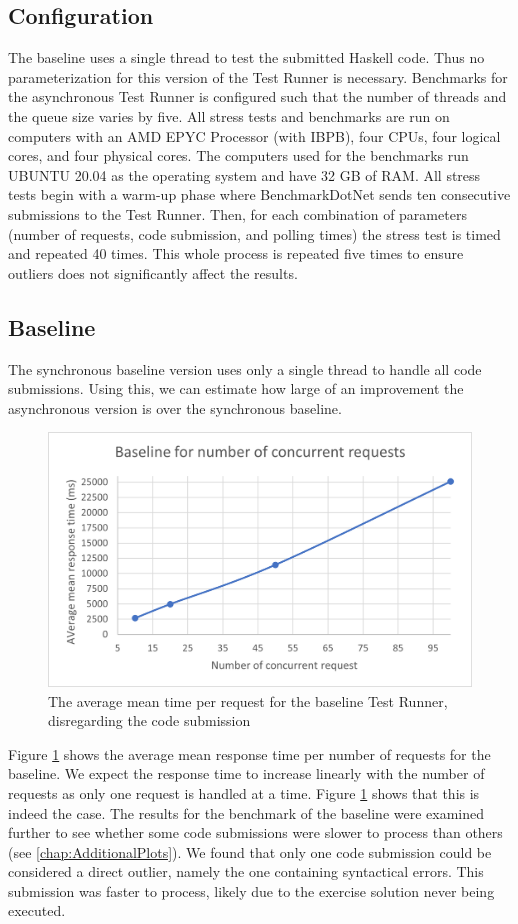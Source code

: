 \subsection{Configuration}
The baseline uses a single thread to test the submitted Haskell code.
Thus no parameterization for this version of the Test Runner is necessary.
Benchmarks for the asynchronous Test Runner is configured such that the number of threads and the queue size varies by five. 
All stress tests and benchmarks are run on computers with an AMD EPYC Processor (with IBPB), four CPUs, four logical cores, and four physical cores.
The computers used for the benchmarks run UBUNTU 20.04 as the operating system and have 32 GB of RAM.
All stress tests begin with a warm-up phase where BenchmarkDotNet sends ten consecutive submissions to the Test Runner. 
Then, for each combination of parameters (number of requests, code submission, and polling times) the stress test is timed and repeated 40 times.
This whole process is repeated five times to ensure outliers does not significantly affect the results.

\subsection{Baseline}
The synchronous baseline version uses only a single thread to handle all code submissions.
Using this, we can estimate how large of an improvement the asynchronous version is over the synchronous baseline.

\begin{figure}
  \centering
  \includegraphics[scale=0.80]{images/baseline.png}
  \caption{The average mean time per request for the baseline Test Runner, disregarding the code submission}
  \label{fig:baseline}
\end{figure}
Figure \ref{fig:baseline} shows the average mean response time per number of requests for the baseline.
We expect the response time to increase linearly with the number of requests as only one request is handled at a time.
Figure \ref{fig:baseline} shows that this is indeed the case.
The results for the benchmark of the baseline were examined further to see whether some code submissions were slower to process than others (see \ref{chap:AdditionalPlots}). 
We found that only one code submission could be considered a direct outlier, namely the one containing syntactical errors.
This submission was faster to process, likely due to the exercise solution never being executed.



